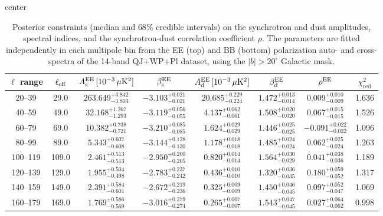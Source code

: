 \begin{table}[h]
\centering
\setlength{\tabcolsep}{4pt}
\caption{Posterior constraints (median and $68\%$ credible intervals) on the synchrotron and dust amplitudes, spectral indices, and the synchrotron-dust correlation coefficient $\rho$. The parameters are fitted independently in each multipole bin from the EE (top) and BB (bottom) polarization auto- and cross-spectra of the 14-band QJ+WP+Pl dataset, using the $|b|>20^\circ$ Galactic mask.}
\label{tab:bin_to_bin_galcut20_all_pairs}
\begin{adjustbox}{center}
\begin{tabular}{cccccccc}
\toprule
$\ell$ range & $\ell_{\rm eff}$ & $A^{\rm EE}_{\rm s}\,[10^{-3}\,\mu\mathrm{K}^2]$ & $\beta^{\rm EE}_{\rm s}$ & $A^{\rm EE}_{\rm d}\,[10^{-3}\,\mu\mathrm{K}^2]$ & $\beta^{\rm EE}_{\rm d}$ & $\rho^{\rm EE}$ & $\chi^2_\mathrm{red}$ \\
\midrule
20--39 & 29.0 & $263.649^{+3.842}_{-3.803}$ & $-3.103^{+0.021}_{-0.021}$ & $20.685^{+0.229}_{-0.224}$ & $1.472^{+0.013}_{-0.014}$ & $0.009^{+0.010}_{-0.009}$ & 1.636 \\
40--59 & 49.0 & $32.168^{+1.267}_{-1.293}$ & $-3.119^{+0.056}_{-0.055}$ & $4.137^{+0.062}_{-0.061}$ & $1.508^{+0.020}_{-0.020}$ & $0.067^{+0.015}_{-0.015}$ & 1.526 \\
60--79 & 69.0 & $10.382^{+0.738}_{-0.721}$ & $-3.210^{+0.085}_{-0.085}$ & $1.624^{+0.029}_{-0.029}$ & $1.446^{+0.025}_{-0.025}$ & $-0.091^{+0.022}_{-0.022}$ & 1.096 \\
80--99 & 89.0 & $5.343^{+0.607}_{-0.608}$ & $-3.144^{+0.128}_{-0.130}$ & $1.178^{+0.018}_{-0.018}$ & $1.485^{+0.024}_{-0.024}$ & $0.062^{+0.025}_{-0.024}$ & 1.263 \\
100--119 & 109.0 & $2.461^{+0.513}_{-0.513}$ & $-2.950^{+0.200}_{-0.205}$ & $0.820^{+0.014}_{-0.014}$ & $1.564^{+0.030}_{-0.029}$ & $0.041^{+0.038}_{-0.036}$ & 1.189 \\
120--139 & 129.0 & $1.955^{+0.504}_{-0.498}$ & $-2.783^{+0.237}_{-0.242}$ & $0.436^{+0.010}_{-0.010}$ & $1.320^{+0.036}_{-0.035}$ & $0.180^{+0.059}_{-0.052}$ & 1.317 \\
140--159 & 149.0 & $2.391^{+0.584}_{-0.601}$ & $-2.672^{+0.219}_{-0.236}$ & $0.325^{+0.009}_{-0.009}$ & $1.450^{+0.046}_{-0.045}$ & $0.097^{+0.052}_{-0.047}$ & 1.069 \\
160--179 & 169.0 & $1.769^{+0.586}_{-0.569}$ & $-3.016^{+0.279}_{-0.274}$ & $0.265^{+0.007}_{-0.007}$ & $1.543^{+0.047}_{-0.045}$ & $0.027^{+0.064}_{-0.062}$ & 0.998 \\

\end{tabular}
\end{adjustbox}
\end{table}
